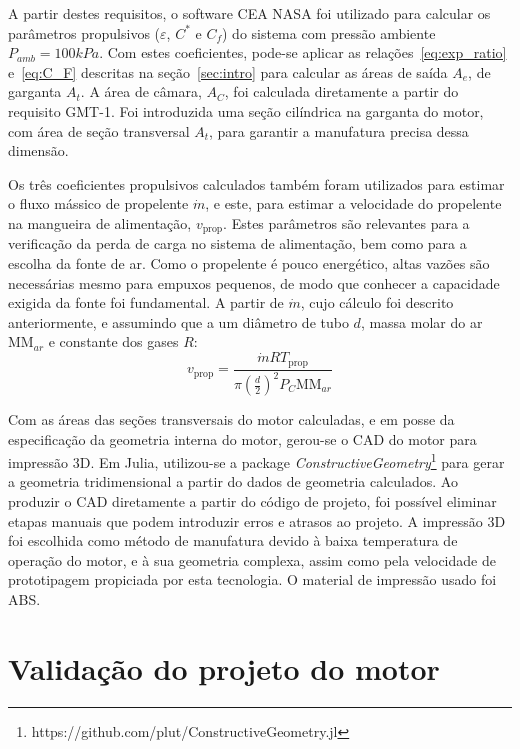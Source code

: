 A partir destes requisitos, o software CEA NASA foi utilizado para calcular os parâmetros propulsivos (\(\varepsilon \), \(C^\ast \) e \(C_f\)) do sistema com pressão ambiente \(P_{amb} = 100kPa\). Com estes coeficientes, pode-se aplicar as relações~\ref{eq:exp_ratio} e~\ref{eq:C_F} descritas na seção~\ref{sec:intro} para calcular as áreas de saída \(A_e\), de garganta \(A_t\). A área de câmara, \(A_C\), foi calculada diretamente a partir do requisito GMT-1. Foi introduzida uma seção cilíndrica na garganta do motor, com área de seção transversal \(A_t\), para garantir a manufatura precisa dessa dimensão.

Os três coeficientes propulsivos calculados também foram utilizados para estimar o fluxo mássico de propelente \(\dot{m}\), e este, para estimar a velocidade do propelente na mangueira de alimentação, \(v_{\text{prop}}\). Estes parâmetros são relevantes para a verificação da perda de carga no sistema de alimentação, bem como para a escolha da fonte de ar. Como o propelente é pouco energético, altas vazões são necessárias mesmo para empuxos pequenos, de modo que conhecer a capacidade exigida da fonte foi fundamental. A partir de \(\dot{m}\), cujo cálculo foi descrito anteriormente, e assumindo que a  um diâmetro de tubo \(d\), massa molar do ar \(\mathrm{MM}_{ar}\) e constante dos gases \(R\):
\begin{equation}
    v_{\text{prop}} = \frac{\dot{m} R T_{\text{prop}}}{\pi {\left(\frac{d}{2}\right)}^2 P_C \mathrm{MM}_{ar}}
\end{equation}

Com as áreas das seções transversais do motor calculadas, e em posse da especificação da geometria interna do motor, gerou-se o CAD do motor para impressão 3D. Em Julia, utilizou-se a package \textit{ConstructiveGeometry}\footnote[1]{https://github.com/plut/ConstructiveGeometry.jl} para gerar a geometria tridimensional a partir do dados de geometria calculados. Ao produzir o CAD diretamente a partir do código de projeto, foi possível eliminar etapas manuais que podem introduzir erros e atrasos ao projeto. A impressão 3D foi escolhida como método de manufatura devido à baixa temperatura de operação do motor, e à sua geometria complexa, assim como pela velocidade de prototipagem propiciada por esta tecnologia. O material de impressão usado foi ABS.\@

\section{Validação do projeto do motor}\label{sec:method_validation}

